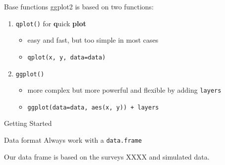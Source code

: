 \documentclass{beamer}\usepackage[]{graphicx}\usepackage[]{color}
\begin{document}
\begin{frame}{Base functions}
ggplot2 is based on two functions:
  \begin{enumerate}
		\item  \texttt{qplot()} for \textbf{q}uick \textbf{plot}
		\begin{itemize}
			\item easy and fast, but too simple in most cases
			\item \texttt{qplot(x, y, data=data)}
		\end{itemize}
    \vspace{0.5cm}
    \item \texttt{ggplot()}
      	\begin{itemize}
			\item more complex but more powerful and flexible by adding \texttt{layers}
			\item \texttt{ggplot(data=data, aes(x, y)) + layers}
		\end{itemize}
  \end{enumerate}
\end{frame}


\begin{frame}[fragile]{Getting Started}

  \begin{alertblock}{Data format}
    Always work with a \texttt{data.frame}
  \end{alertblock}
    Our data frame is based on the surveys XXXX and simulated data.

\end{frame}
\end{document}
